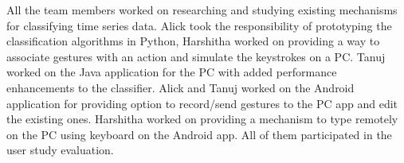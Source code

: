 \documentclass{sigchi}
\begin{document}
All the team members worked on researching and studying existing mechanisms for classifying time series data. Alick took the responsibility of prototyping the classification algorithms in Python, Harshitha worked on providing a way to associate gestures with an action and simulate the keystrokes on a PC. Tanuj worked on the Java application for the PC with added performance enhancements to the classifier. Alick and Tanuj worked on the Android application for providing option to record/send gestures to the PC app and edit the existing ones. Harshitha worked on providing a mechanism to type remotely on the PC using keyboard on the Android app. All of them participated in the user study evaluation.

\def\UrlBreaks{\do\/\do-}

\balance

\end{document}

